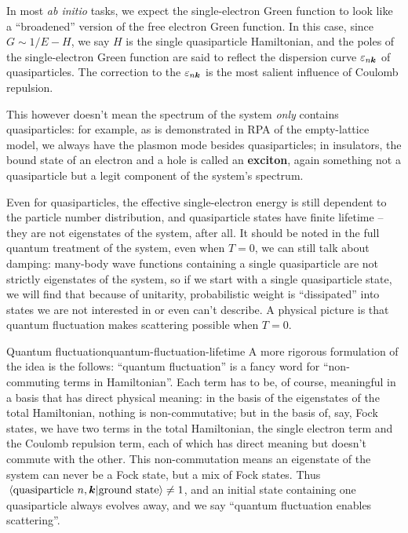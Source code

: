 \documentclass[hyperref, a4paper]{report}
\newcommand*{\concept}[1]{{\textbf{#1}}}
\newcommand*{\abinitio}{\textit{ab initio}}
\begin{document}
In most \abinitio{} tasks, 
we expect the single-electron Green function 
to look like a ``broadened'' version of the free electron Green function.
In this case, 
since $G \sim 1 / E - H$,
we say $H$ is the single quasiparticle Hamiltonian,
and the poles of the single-electron Green function 
are said to reflect the dispersion curve $\varepsilon_{n \vb*{k}}$ of quasiparticles.
The correction to the $\varepsilon_{n \vb*{k}}$ 
is the most salient influence of Coulomb repulsion.

This however doesn't mean the spectrum of the system 
\emph{only} contains quasiparticles: 
for example, as is demonstrated in RPA of the empty-lattice model,
we always have the plasmon mode besides quasiparticles; 
in insulators, 
the bound state of an electron and a hole is called an \concept{exciton},
again something not a quasiparticle but a legit component of the system's spectrum. 

Even for quasiparticles, 
the effective single-electron energy 
is still dependent to the particle number distribution,
and quasiparticle states have finite lifetime -- 
they are not eigenstates of the system, after all.
It should be noted in the full quantum treatment of the system,
even when $T = 0$,
we can still talk about damping:
many-body wave functions containing a single quasiparticle 
are not strictly eigenstates of the system, 
so if we start with a single quasiparticle state, 
we will find that because of unitarity, 
probabilistic weight is ``dissipated'' into states we are not interested in or even can't describe. 
A physical picture is that quantum fluctuation
makes scattering possible when $T = 0$.

\begin{theorybox}{Quantum fluctuation}{quantum-fluctuation-lifetime}
    A more rigorous formulation of the idea is the follows: 
    ``quantum fluctuation'' is a fancy word for ``non-commuting terms in Hamiltonian''. 
    Each term has to be, of course, meaningful in a basis that has direct physical meaning:
    in the basis of the eigenstates of the total Hamiltonian,
    nothing is non-commutative; 
    but in the basis of, say, Fock states, 
    we have two terms in the total Hamiltonian, 
    the single electron term and the Coulomb repulsion term, 
    each of which has direct meaning but doesn't commute with the other. 
    This non-commutation means 
    an eigenstate of the system can never be a Fock state, 
    but a mix of Fock states. 
    Thus $\braket*{\text{quasiparticle $n, \vb*{k}$}}{\text{ground state}} \neq 1$,
    and an initial state containing one quasiparticle 
    always evolves away,
    and we say ``quantum fluctuation enables scattering''.
\end{theorybox}
\end{document}
